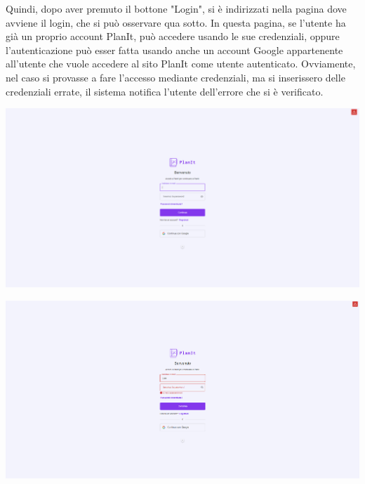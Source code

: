 Quindi, dopo aver premuto il bottone "Login", si è indirizzati nella pagina dove avviene il login, che si può osservare qua sotto. In questa pagina, se l'utente ha già un proprio account PlanIt, può accedere usando le sue credenziali, oppure l'autenticazione può esser fatta usando anche un account Google appartenente all'utente che vuole accedere al sito PlanIt come utente autenticato. Ovviamente, nel caso si provasse a fare l'accesso mediante credenziali, ma si inserissero delle credenziali errate, il sistema notifica l'utente dell'errore che si è verificato.
\begin{center}
    \includegraphics[width=1\textwidth, height=0.3\textheight]{img/png/FrontEnd/Homepage_Autenticazione/login.png}
\end{center}

\begin{center}
    \includegraphics[width=1\textwidth, height=0.3\textheight]{img/png/FrontEnd/Homepage_Autenticazione/login_errato.png}
\end{center}

